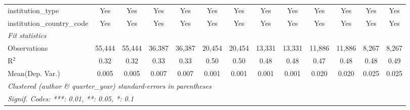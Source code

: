 \begin{tabular}{lcccccccccccc}
   institution\_type                        & Yes           & Yes             & Yes           & Yes             & Yes           & Yes           & Yes            & Yes           & Yes           & Yes            & Yes           & Yes\\  
   institution\_country\_code               & Yes           & Yes             & Yes           & Yes             & Yes           & Yes           & Yes            & Yes           & Yes           & Yes            & Yes           & Yes\\  
   \midrule
   \emph{Fit statistics}\\
   Observations                             & 55,444        & 55,444          & 36,387        & 36,387          & 20,454        & 20,454        & 13,331         & 13,331        & 11,886        & 11,886         & 8,267         & 8,267\\  
   R$^2$                                    & 0.32          & 0.32            & 0.33          & 0.33            & 0.50          & 0.50          & 0.48           & 0.48          & 0.47          & 0.48           & 0.48          & 0.49\\  
Mean(Dep. Var.) & 0.005 & 0.005 & 0.007 & 0.007 & 0.001 & 0.001 & 0.001 & 0.001 & 0.020 & 0.020 & 0.025 & 0.025 \\
   \midrule \midrule
   \multicolumn{13}{l}{\emph{Clustered (author \& quarter\_year) standard-errors in parentheses}}\\
   \multicolumn{13}{l}{\emph{Signif. Codes: ***: 0.01, **: 0.05, *: 0.1}}\\
\end{tabular}
\par\endgroup
